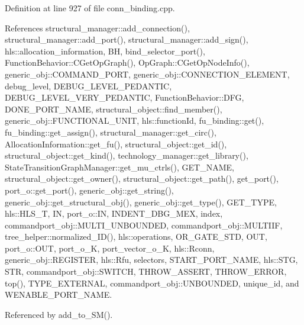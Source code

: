 Definition at line 927 of file conn\+\_\+binding.\+cpp.



References structural\+\_\+manager\+::add\+\_\+connection(), structural\+\_\+manager\+::add\+\_\+port(), structural\+\_\+manager\+::add\+\_\+sign(), hls\+::allocation\+\_\+information, BH, bind\+\_\+selector\+\_\+port(), Function\+Behavior\+::\+C\+Get\+Op\+Graph(), Op\+Graph\+::\+C\+Get\+Op\+Node\+Info(), generic\+\_\+obj\+::\+C\+O\+M\+M\+A\+N\+D\+\_\+\+P\+O\+RT, generic\+\_\+obj\+::\+C\+O\+N\+N\+E\+C\+T\+I\+O\+N\+\_\+\+E\+L\+E\+M\+E\+NT, debug\+\_\+level, D\+E\+B\+U\+G\+\_\+\+L\+E\+V\+E\+L\+\_\+\+P\+E\+D\+A\+N\+T\+IC, D\+E\+B\+U\+G\+\_\+\+L\+E\+V\+E\+L\+\_\+\+V\+E\+R\+Y\+\_\+\+P\+E\+D\+A\+N\+T\+IC, Function\+Behavior\+::\+D\+FG, D\+O\+N\+E\+\_\+\+P\+O\+R\+T\+\_\+\+N\+A\+ME, structural\+\_\+object\+::find\+\_\+member(), generic\+\_\+obj\+::\+F\+U\+N\+C\+T\+I\+O\+N\+A\+L\+\_\+\+U\+N\+IT, hls\+::function\+Id, fu\+\_\+binding\+::get(), fu\+\_\+binding\+::get\+\_\+assign(), structural\+\_\+manager\+::get\+\_\+circ(), Allocation\+Information\+::get\+\_\+fu(), structural\+\_\+object\+::get\+\_\+id(), structural\+\_\+object\+::get\+\_\+kind(), technology\+\_\+manager\+::get\+\_\+library(), State\+Transition\+Graph\+Manager\+::get\+\_\+mu\+\_\+ctrls(), G\+E\+T\+\_\+\+N\+A\+ME, structural\+\_\+object\+::get\+\_\+owner(), structural\+\_\+object\+::get\+\_\+path(), get\+\_\+port(), port\+\_\+o\+::get\+\_\+port(), generic\+\_\+obj\+::get\+\_\+string(), generic\+\_\+obj\+::get\+\_\+structural\+\_\+obj(), generic\+\_\+obj\+::get\+\_\+type(), G\+E\+T\+\_\+\+T\+Y\+PE, hls\+::\+H\+L\+S\+\_\+T, IN, port\+\_\+o\+::\+IN, I\+N\+D\+E\+N\+T\+\_\+\+D\+B\+G\+\_\+\+M\+EX, index, commandport\+\_\+obj\+::\+M\+U\+L\+T\+I\+\_\+\+U\+N\+B\+O\+U\+N\+D\+ED, commandport\+\_\+obj\+::\+M\+U\+L\+T\+I\+IF, tree\+\_\+helper\+::normalized\+\_\+\+I\+D(), hls\+::operations, O\+R\+\_\+\+G\+A\+T\+E\+\_\+\+S\+TD, O\+UT, port\+\_\+o\+::\+O\+UT, port\+\_\+o\+\_\+K, port\+\_\+vector\+\_\+o\+\_\+K, hls\+::\+Rconn, generic\+\_\+obj\+::\+R\+E\+G\+I\+S\+T\+ER, hls\+::\+Rfu, selectors, S\+T\+A\+R\+T\+\_\+\+P\+O\+R\+T\+\_\+\+N\+A\+ME, hls\+::\+S\+TG, S\+TR, commandport\+\_\+obj\+::\+S\+W\+I\+T\+CH, T\+H\+R\+O\+W\+\_\+\+A\+S\+S\+E\+RT, T\+H\+R\+O\+W\+\_\+\+E\+R\+R\+OR, top(), T\+Y\+P\+E\+\_\+\+E\+X\+T\+E\+R\+N\+AL, commandport\+\_\+obj\+::\+U\+N\+B\+O\+U\+N\+D\+ED, unique\+\_\+id, and W\+E\+N\+A\+B\+L\+E\+\_\+\+P\+O\+R\+T\+\_\+\+N\+A\+ME.



Referenced by add\+\_\+to\+\_\+\+S\+M().

